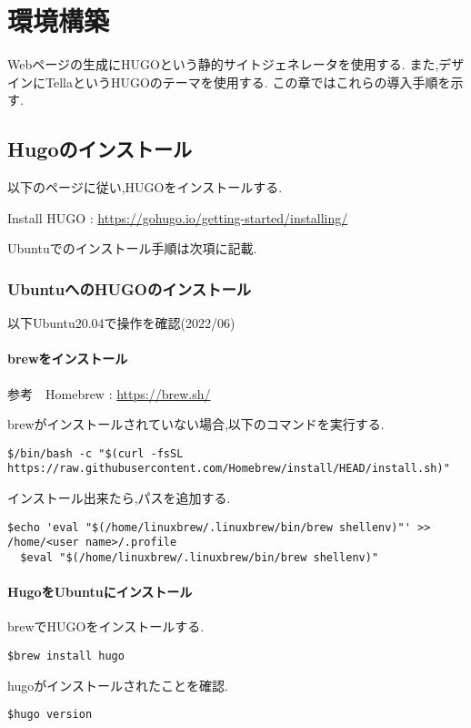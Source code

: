 \section{環境構築}
Webページの生成にHUGOという静的サイトジェネレータを使用する.
また,デザインにTellaというHUGOのテーマを使用する.
この章ではこれらの導入手順を示す.

\subsection{Hugoのインストール}
以下のページに従い,HUGOをインストールする.

Install HUGO : \url{https://gohugo.io/getting-started/installing/}

Ubuntuでのインストール手順は次項に記載.

\subsubsection{UbuntuへのHUGOのインストール}
以下Ubuntu20.04で操作を確認(2022/06)

\paragraph{brewをインストール} \leavevmode
参考　Homebrew : \url{https://brew.sh/}

brewがインストールされていない場合,以下のコマンドを実行する.
\begin{lstlisting}[]
  $/bin/bash -c "$(curl -fsSL https://raw.githubusercontent.com/Homebrew/install/HEAD/install.sh)"
\end{lstlisting}

インストール出来たら,パスを追加する.
\begin{lstlisting}[]
  $echo 'eval "$(/home/linuxbrew/.linuxbrew/bin/brew shellenv)"' >> /home/<user name>/.profile
  $eval "$(/home/linuxbrew/.linuxbrew/bin/brew shellenv)"
\end{lstlisting}

\paragraph{HugoをUbuntuにインストール} \leavevmode
brewでHUGOをインストールする.
\begin{lstlisting}[]
  $brew install hugo
\end{lstlisting}

hugoがインストールされたことを確認.
\begin{lstlisting}[]
  $hugo version
\end{lstlisting}

